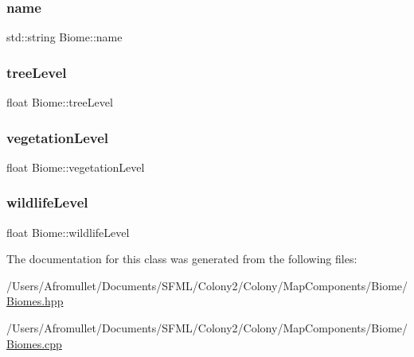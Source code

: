 \mbox{\label{class_biome_a45d0a14ac780f5a5a0215df8be24e8cf}} 
\subsubsection{\texorpdfstring{name}{name}}
{\footnotesize\ttfamily std\+::string Biome\+::name\hspace{0.3cm}{\ttfamily [private]}}

\mbox{\label{class_biome_aab11a193d913aeccf5a5d4d8af6ccd05}} 
\subsubsection{\texorpdfstring{tree\+Level}{treeLevel}}
{\footnotesize\ttfamily float Biome\+::tree\+Level\hspace{0.3cm}{\ttfamily [private]}}

\mbox{\label{class_biome_af2e689d891f991d1ec7abedb2d8cbfe6}} 
\subsubsection{\texorpdfstring{vegetation\+Level}{vegetationLevel}}
{\footnotesize\ttfamily float Biome\+::vegetation\+Level\hspace{0.3cm}{\ttfamily [private]}}

\mbox{\label{class_biome_a4568b5f65ed8b774ef37d1126bb5ecd1}} 
\subsubsection{\texorpdfstring{wildlife\+Level}{wildlifeLevel}}
{\footnotesize\ttfamily float Biome\+::wildlife\+Level\hspace{0.3cm}{\ttfamily [private]}}



The documentation for this class was generated from the following files\+:\begin{DoxyCompactItemize}
\item 
/\+Users/\+Afromullet/\+Documents/\+S\+F\+M\+L/\+Colony2/\+Colony/\+Map\+Components/\+Biome/\mbox{\hyperlink{_biomes_8hpp}{Biomes.\+hpp}}\item 
/\+Users/\+Afromullet/\+Documents/\+S\+F\+M\+L/\+Colony2/\+Colony/\+Map\+Components/\+Biome/\mbox{\hyperlink{_biomes_8cpp}{Biomes.\+cpp}}\end{DoxyCompactItemize}
